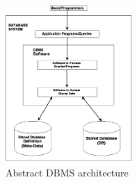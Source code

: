  \begin{figure} 
      \centering
      \includegraphics[width=\textwidth,height=6cm]{Images/db_arch}
      \caption{Abstract DBMS architecture}
      \label{fig:counting-methods}
    \end{figure}

  

